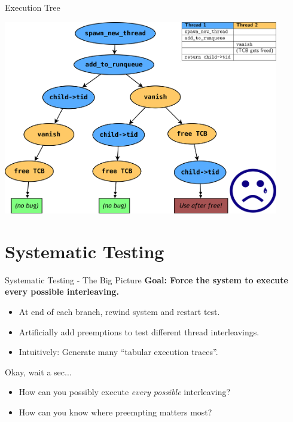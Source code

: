 \documentclass[xcolor=dvipsnames]{beamer}
\begin{document}
\begin{frame}{Execution Tree}
	\begin{center}
		\includegraphics[width=0.9\textwidth]{threadfork2.png}
	\end{center}
\end{frame}



\section{Systematic Testing}


\begin{frame}{Systematic Testing - The Big Picture}
	\textbf{Goal: Force the system to execute every possible interleaving.}
	\begin{itemize}
		\item At end of each branch, rewind system and restart test.
		\item Artificially add preemptions to test different thread interleavings.
		\item Intuitively: Generate many ``tabular execution traces''.
	\end{itemize}
	\pause
	\linegap

	Okay, wait a sec...
	\begin{itemize}
		\item How can you possibly execute {\em every possible} interleaving?
		\item How can you know where preempting matters most?
	\end{itemize}
\end{frame}
\end{document}
